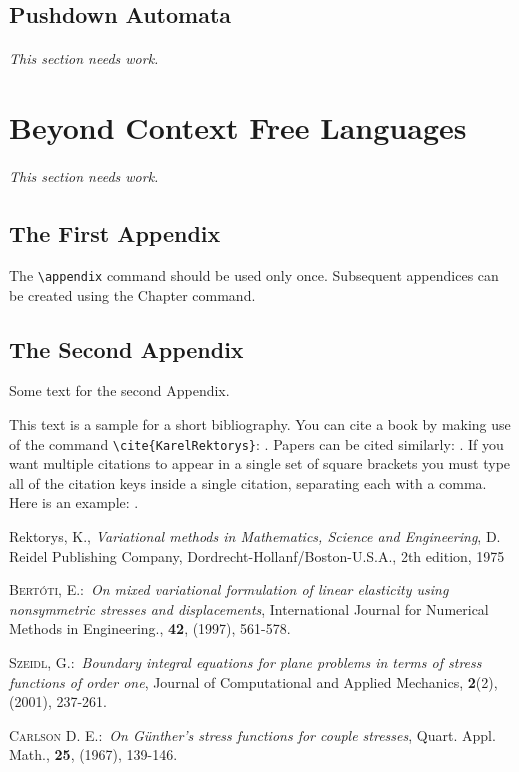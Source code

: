 \documentclass[letterpaper,12pt,openany,reqno]{book}%
\newcommand{\needswork}{\paragraph{This section needs work.}}
\begin{document}
\chapter{Pushdown Automata}
\needswork{}

\part{Beyond Context Free Languages}
\label{C.Beyond.Context.Free}
\needswork{}

\appendix

\chapter{The First Appendix}

The \verb"\appendix" command should be used only once. Subsequent appendices can
be created using the Chapter command.

\chapter{The Second Appendix}

Some text for the second Appendix.

This text is a sample for a short bibliography. You can cite a book by making use of
the command \verb"\cite{KarelRektorys}": \cite{KarelRektorys}. Papers can be cited
similarly: \cite{Bertoti97}. If you want multiple citations to appear in a single set
of square brackets you must type all of the citation keys inside a single citation,
separating each with a comma. Here is an example: \cite{Bertoti97, Szeidl2001,
Carlson67}.

\begin{thebibliography}{9}
Rektorys, K., \textit{Variational methods in Mathematics,
Science and Engineering}, D. Reidel Publishing Company,
Dordrecht-Hollanf/Boston-U.S.A., 2th edition, 1975

 \textsc{Bert\'{o}ti, E.}:\ \textit{On mixed variational formulation
of linear elasticity using nonsymmetric stresses and displacements}, International
Journal for Numerical Methods in Engineering., \textbf{42}, (1997), 561-578.

 \textsc{Szeidl, G.}:\ \textit{Boundary integral equations for
plane problems in terms of stress functions of order one}, Journal of Computational and
Applied Mechanics, \textbf{2}(2), (2001), 237-261.

  \textsc{Carlson D. E.}:\ \textit{On G\"{u}nther's stress functions
for couple stresses}, Quart. Appl. Math., \textbf{25}, (1967), 139-146.
\end{thebibliography}
\end{document}
